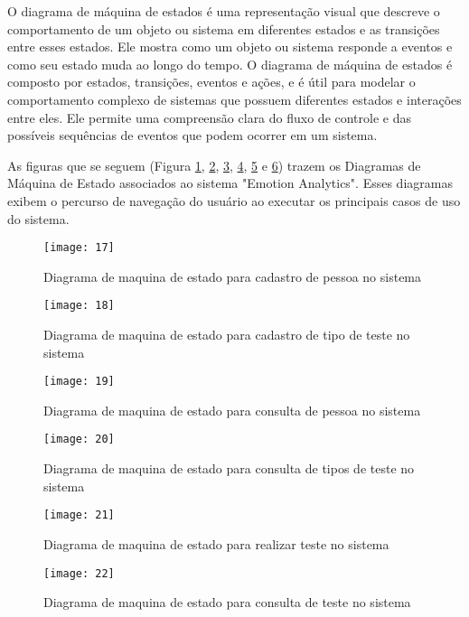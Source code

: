 O diagrama de máquina de estados \cite{30} é uma representação visual que descreve o comportamento de um objeto ou sistema em diferentes estados e as transições entre esses estados. Ele mostra como um objeto ou sistema responde a eventos e como seu estado muda ao longo do tempo. O diagrama de máquina de estados é composto por estados, transições, eventos e ações, e é útil para modelar o comportamento complexo de sistemas que possuem diferentes estados e interações entre eles. Ele permite uma compreensão clara do fluxo de controle e das possíveis sequências de eventos que podem ocorrer em um sistema.

As figuras que se seguem (Figura \ref{fig:17}, \ref{fig:18}, \ref{fig:19}, \ref{fig:20}, \ref{fig:21} e \ref{fig:22}) trazem os Diagramas de Máquina de Estado associados ao sistema "Emotion Analytics". Esses diagramas exibem o percurso de navegação do usuário ao executar os principais casos de uso do sistema.

\begin{figure}[h]
  \caption{Diagrama de maquina de estado para cadastro de pessoa no sistema}
  \centering
  \texttt{[image: 17]}
  \label{fig:17}
\end{figure}
\FloatBarrier

\begin{figure}[h]
  \caption{Diagrama de maquina de estado para cadastro de tipo de teste no sistema}
  \centering
  \texttt{[image: 18]}
  \label{fig:18}
\end{figure}
\FloatBarrier

\begin{figure}[h]
  \caption{Diagrama de maquina de estado para consulta de pessoa no sistema}
  \centering
  \texttt{[image: 19]}
  \label{fig:19}
\end{figure}
\FloatBarrier

\begin{figure}[h]
  \caption{Diagrama de maquina de estado para consulta de tipos de teste no sistema}
  \centering
  \texttt{[image: 20]}
  \label{fig:20}
\end{figure}
\FloatBarrier

\begin{figure}[h]
  \caption{Diagrama de maquina de estado para realizar teste no sistema}
  \centering
  \texttt{[image: 21]}
  \label{fig:21}
\end{figure}
\FloatBarrier

\begin{figure}[h]
  \caption{Diagrama de maquina de estado para consulta de teste no sistema}
  \centering
  \texttt{[image: 22]}
  \label{fig:22}
\end{figure}
\FloatBarrier
